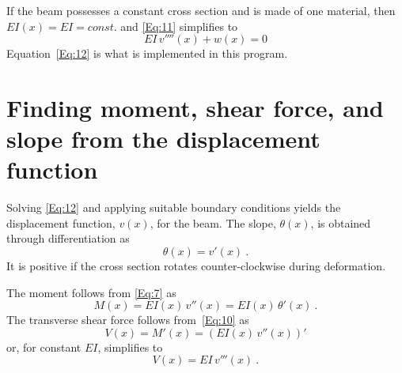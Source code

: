 \documentclass[11pt, oneside]{article}   	%
\begin{document}
If the beam possesses a constant cross section and is made of one material, then $EI(x)=EI=const.$ and
\eqref{Eq:11} simplifies to
\begin{equation}
	EI\,v''''(x) + w(x) = 0
	\label{Eq:12}
\end{equation}
Equation~\eqref{Eq:12} is what is implemented in this program.

\section{Finding moment, shear force, and slope from the displacement function}
Solving \eqref{Eq:12} and applying suitable boundary conditions yields the displacement function, $v(x)$, for the beam.
The slope, $\theta(x)$, is obtained through differentiation as
\begin{equation}
	\theta(x) = v'(x) ~.
	\label{Eq:13}
\end{equation}
It is positive if the cross section rotates counter-clockwise during deformation.

The moment follows from \eqref{Eq:7} as
\begin{equation}
	M(x) = EI(x)\, v''(x) = EI(x)\, \theta'(x) ~.
	\label{Eq:14}
\end{equation}
The transverse shear force follows from~\eqref{Eq:10} as
\begin{equation}
	V(x) = M'(x) = \left( EI(x)\, v''(x) \right)'
	\label{Eq:15}
\end{equation}
or, for constant $EI$, simplifies to
\begin{equation}
	V(x) = EI\, v'''(x) ~.
	\label{Eq:16}
\end{equation}
\end{document}
